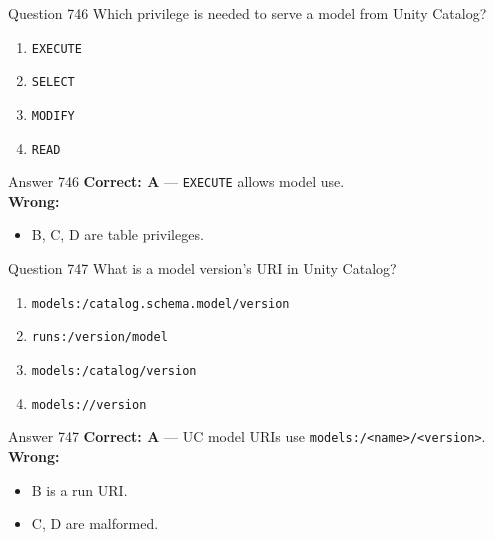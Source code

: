 \documentclass[aspectratio=169,11pt]{beamer}
\begin{document}
	\begin{frame}{Question 746}
		Which privilege is needed to serve a model from Unity Catalog?
		\begin{enumerate}[label=\Alph*.]
			\item \texttt{EXECUTE}
			\item \texttt{SELECT}
			\item \texttt{MODIFY}
			\item \texttt{READ}
		\end{enumerate}
	\end{frame}
	\begin{frame}{Answer 746}
		\textbf{Correct: A} --- \texttt{EXECUTE} allows model use.\\
		\vspace{0.5em}
		\textbf{Wrong:}
		\begin{itemize}
			\item B, C, D are table privileges.
		\end{itemize}
	\end{frame}
	
	\begin{frame}{Question 747}
		What is a model version's URI in Unity Catalog?
		\begin{enumerate}[label=\Alph*.]
			\item \texttt{models:/catalog.schema.model/version}
			\item \texttt{runs:/version/model}
			\item \texttt{models:/catalog/version}
			\item \texttt{models://version}
		\end{enumerate}
	\end{frame}
	\begin{frame}{Answer 747}
		\textbf{Correct: A} --- UC model URIs use \texttt{models:/<name>/<version>}.\\
		\vspace{0.5em}
		\textbf{Wrong:}
		\begin{itemize}
			\item B is a run URI.
			\item C, D are malformed.
		\end{itemize}
	\end{frame}
	
\end{document}
